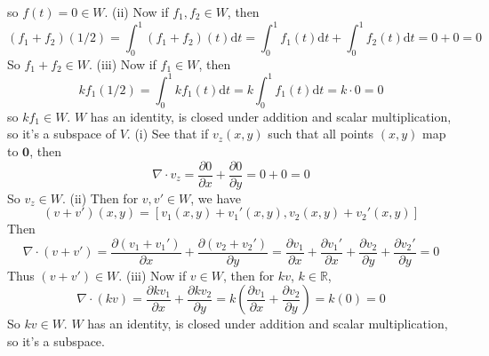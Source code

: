 \documentclass{article}
\begin{document}
so $f(t) = 0 \in W$. (ii) Now if $f_{1}, f_{2} \in W$, then
\begin{equation*}
    (f_{1}+f_{2})(1/2) = \int_{0}^{1}(f_{1}+f_{2})(t)\text{d}t = \int_{0}^{1}f_{1}(t)\text{d}t + \int_{0}^{1}f_{2}(t)\text{d}t = 0 + 0 = 0
\end{equation*}
So $f_{1} + f_{2} \in W$. (iii) Now if $f_{1} \in W$, then
\begin{equation*}
    kf_{1}(1/2) = \int_{0}^{1}kf_{1}(t)\text{d}t = k \int_{0}^{1}f_{1}(t)\text{d}t = k\cdot 0 = 0
\end{equation*}
so $kf_{1} \in W$. $W$ has an identity, is closed under addition and scalar multiplication, so it's a subspace of $V$. \newpage
{} (i) See that if $v_{z}(x,y)$ such that all points $(x,y)$ map to $\mathbf{0}$, then
\begin{equation*}
    \nabla \cdot v_{z} = \frac{\partial 0}{\partial x} + \frac{\partial 0}{\partial y} = 0 + 0 = 0
\end{equation*}
So $v_{z} \in W$. (ii) Then for $v, v' \in W$, we have
\begin{equation*}
    (v + v')(x,y) = [v_{1}(x,y) + v_{1}'(x,y), v_{2}(x,y) + v_{2}'(x,y)]
\end{equation*}
Then \begin{equation*}
\nabla \cdot (v+v') = \frac{\partial (v_{1} + v_{1}')}{\partial x} + \frac{\partial (v_{2} + v_{2}')}{\partial y} = \frac{\partial v_{1}}{\partial x} + \frac{\partial v_{1}'}{\partial x} + \frac{\partial v_{2}}{\partial y} + \frac{\partial v_{2}'}{\partial y} = 0
\end{equation*}
Thus $(v+v') \in W$. (iii) Now if $v\in W$, then for $kv$, $k \in \mathbb{R}$,
\begin{equation*}
    \nabla \cdot (k v) = \frac{\partial kv_{1}}{\partial x} + \frac{\partial kv_{2}}{\partial y} = k\left(\frac{\partial v_{1}}{\partial x} + \frac{\partial v_{2}}{\partial y}\right) = k(0) = 0
\end{equation*}
So $kv \in W$. $W$ has an identity, is closed under addition and scalar multiplication, so it's a subspace.
\end{document}
